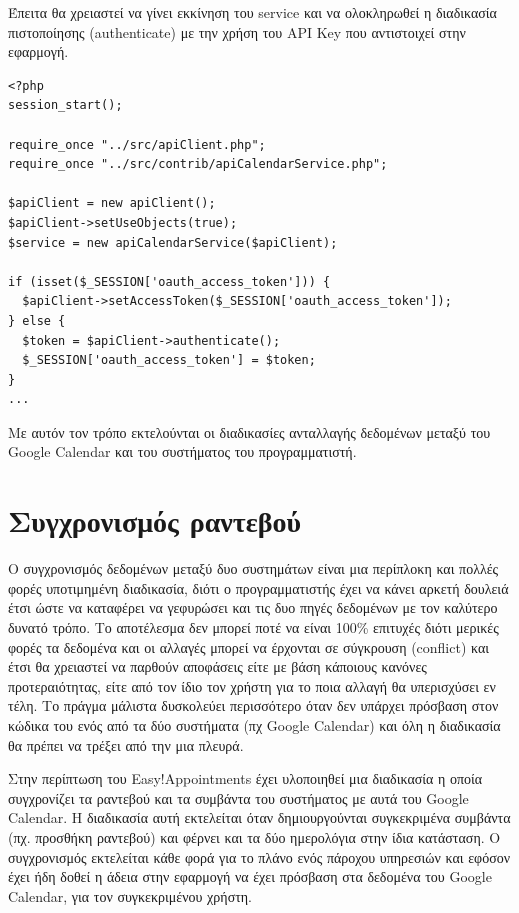 Έπειτα θα χρειαστεί να γίνει εκκίνηση του service και να ολοκληρωθεί η διαδικασία πιστοποίησης (authenticate) με την χρήση του API Key  που αντιστοιχεί στην εφαρμογή.

\begin{lstlisting}[breaklines=true]
<?php
session_start();

require_once "../src/apiClient.php";
require_once "../src/contrib/apiCalendarService.php";

$apiClient = new apiClient();
$apiClient->setUseObjects(true);
$service = new apiCalendarService($apiClient);

if (isset($_SESSION['oauth_access_token'])) {
  $apiClient->setAccessToken($_SESSION['oauth_access_token']);
} else {
  $token = $apiClient->authenticate();
  $_SESSION['oauth_access_token'] = $token;
}
...
\end{lstlisting}

Με αυτόν τον τρόπο εκτελούνται οι διαδικασίες ανταλλαγής δεδομένων μεταξύ του Google Calendar και του συστήματος του προγραμματιστή.

\section{Συγχρονισμός ραντεβού}
Ο συγχρονισμός δεδομένων μεταξύ δυο συστημάτων είναι μια περίπλοκη και πολλές φορές υποτιμημένη διαδικασία, διότι ο προγραμματιστής έχει να κάνει αρκετή δουλειά έτσι ώστε να καταφέρει να γεφυρώσει και τις δυο πηγές δεδομένων με τον καλύτερο δυνατό τρόπο. Το αποτέλεσμα δεν μπορεί ποτέ να είναι 100\% επιτυχές διότι μερικές φορές τα δεδομένα και οι αλλαγές μπορεί να έρχονται σε σύγκρουση (conflict) και έτσι θα χρειαστεί να παρθούν αποφάσεις είτε με βάση κάποιους κανόνες προτεραιότητας, είτε από τον ίδιο τον χρήστη για το ποια αλλαγή θα υπερισχύσει εν τέλη. Το πράγμα μάλιστα δυσκολεύει περισσότερο όταν δεν υπάρχει πρόσβαση στον κώδικα του ενός από τα δύο συστήματα (πχ Google Calendar) και όλη η διαδικασία θα πρέπει να τρέξει από την μια πλευρά. 

Στην περίπτωση του Easy!Appointments έχει υλοποιηθεί μια διαδικασία η οποία συγχρονίζει τα ραντεβού και τα συμβάντα του συστήματος με αυτά του Google Calendar. Η διαδικασία αυτή εκτελείται όταν δημιουργούνται συγκεκριμένα συμβάντα (πχ. προσθήκη ραντεβού) και φέρνει και τα δύο ημερολόγια στην ίδια κατάσταση. Ο συγχρονισμός εκτελείται κάθε φορά για το πλάνο ενός πάροχου υπηρεσιών και εφόσον έχει ήδη δοθεί η άδεια στην εφαρμογή να έχει πρόσβαση στα δεδομένα του Google Calendar, για τον συγκεκριμένου χρήστη.

